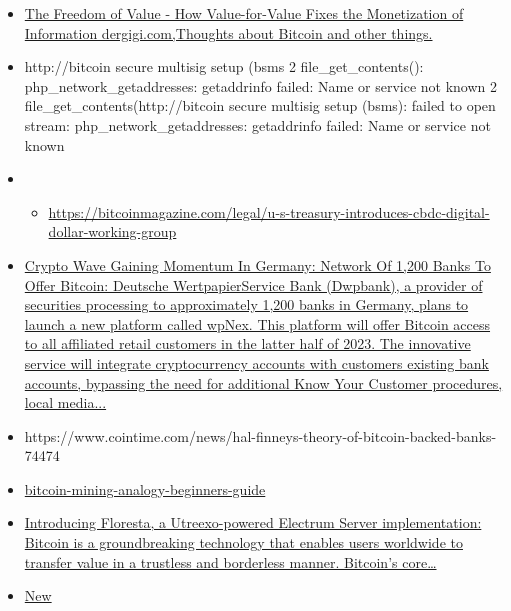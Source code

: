 \begin{itemize}
  \begin{itemize}
  \item
    \href{https://dergigi.com/2021/12/30/the-freedom-of-value/}{The
    Freedom of Value - How Value-for-Value Fixes the Monetization of
    Information \textbar{} dergigi.com,Thoughts about Bitcoin and other
    things.}
  \item
    http://bitcoin secure multisig setup (bsms 2 file\_get\_contents():
    php\_network\_getaddresses: getaddrinfo failed: Name or service not
    known 2 file\_get\_contents(http://bitcoin secure multisig setup
    (bsms): failed to open stream: php\_network\_getaddresses:
    getaddrinfo failed: Name or service not known
  \item
    \begin{itemize}
     
    \item
      \url{https://bitcoinmagazine.com/legal/u-s-treasury-introduces-cbdc-digital-dollar-working-group}
    \end{itemize}
  \item
    \href{https://www.msn.com/en-us/money/news/crypto-wave-gaining-momentum-in-germany-network-of-1-200-banks-to-offer-bitcoin/ar-AA198Lxc}{Crypto
    Wave Gaining Momentum In Germany: Network Of 1,200 Banks To Offer
    Bitcoin: Deutsche WertpapierService Bank (Dwpbank), a provider of
    securities processing to approximately 1,200 banks in Germany, plans
    to launch a new platform called wpNex. This platform will offer
    Bitcoin access to all affiliated retail customers in the latter half
    of 2023. The innovative service will integrate cryptocurrency
    accounts with customers\textquotesingle{} existing bank accounts,
    bypassing the need for additional Know Your Customer procedures,
    local media...}
  \item
    https://www.cointime.com/news/hal-finneys-theory-of-bitcoin-backed-banks-74474
  \item
    \href{https://braiins.com/blog/bitcoin-mining-analogy-beginners-guide}{bitcoin-mining-analogy-beginners-guide}
  \item
    \href{https://medium.com/vinteum-org/introducing-floresta-an-utreexo-powered-electrum-server-implementation-60feba8e179d}{Introducing
    Floresta, a Utreexo-powered Electrum Server implementation: Bitcoin
    is a groundbreaking technology that enables users worldwide to
    transfer value in a trustless and borderless manner. Bitcoin's
    core\ldots{}}
  \item
    \href{https://www.whitehouse.gov/wp-content/uploads/2023/03/ERP-2023.pdf}{New
}
\end{itemize}
\end{itemize}
